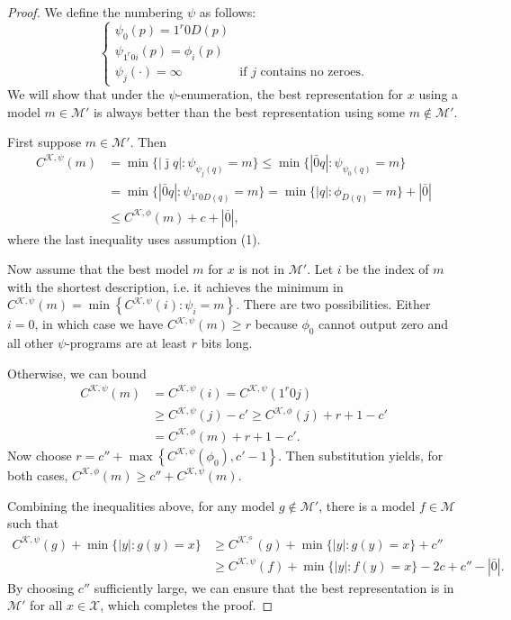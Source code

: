 \documentclass{style/llncs}
\newcommand{\M}{\mathscr M}
\newcommand{\K}{\mathscr K}
\newcommand{\X}{\mathscr X}
\newcommand{\br}[1]{\overline{#1}}
\begin{document}
\begin{proof}
We define the numbering $\psi$ as follows:
\[\begin{cases}
\psi_0(p) = 1^r 0 D(p) \\
\psi_{1^r0i}(p) = \phi_i(p) \\
\psi_j(\cdot) = \infty &\text{if $j$ contains no zeroes.}
\end{cases}\]
We will show that under the $\psi$-enumeration, the best representation for $x$ using a model $m\in\M'$ is always better than the best representation using some $m\notin\M'$.

First suppose $m\in\M'$. Then
\begin{align*}
C^{\K,\psi}(m) &=\min\{|\bar\jmath q|:\psi_{\psi_j(q)}=m\}
\leq\min\{|\bar0 q|:\psi_{\psi_0(q)}=m\} \\ 
&=\min\{|\bar0 q|:\psi_{1^r0 D(q)}=m\}  
=\min\{|q|:\phi_{D(q)}=m\} + |\bar 0|\\
&\leq C^{\K,\phi}(m)+c+|\br{0}|,
\end{align*}
where the last inequality uses assumption (1).

Now assume that the best model $m$ for $x$ is not in $\M'$. 
Let $i$ be the index of $m$ with the shortest description, i.e. it achieves the minimum in $C^{\K, \psi}(m)=\min\left\{C^{\K,\psi}(i):\psi_i=m\right\}$.
There are two possibilities. Either $i = 0$, in which case we have $C^{\K,\psi}(m)\ge r$ because $\phi_0$ cannot output zero and all other $\psi$-programs are at least $r$ bits long.

Otherwise, we can bound
\begin{align*}
C^{\K,\psi}(m)&=C^{\K,\psi}(i)=C^{\K,\psi}(1^r0j)\\
&\ge C^{\K,\psi}(j)-c' \ge C^{\K,\phi}(j)+r+1-c'\\
&=C^{\K,\phi}(m)+r+1-c'.
\end{align*}
Now choose $r=c''+\max\left\{C^{\K,\psi}(\phi_0),c'-1\right\}$. Then substitution yields, for both cases, 
$C^{\K,\phi}(m)\ge c''+C^{\K,\psi}(m)$.

Combining the inequalities above, for any model $g\not\in\M'$, there is a model $f\in\M$ such that
\[\begin{split}
C^{\K,\psi}(g)+\min \{|y| : g(y) = x\} &\ge C^{\K,^\phi}(g)+\min\{|y| : g(y) = x\}+c''\\
&\ge C^{\K,\psi}(f)+\min \{|y| : f(y) = x\} -2c+c'' -|\bar0|.
\end{split}\]
By choosing $c''$ sufficiently large, we can ensure that the best representation is in $\M'$ for all $x\in\X$, which completes the proof.
\end{proof}
\end{document}
